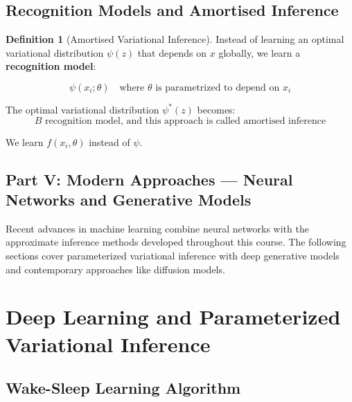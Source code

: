 \documentclass[12pt,a4paper]{article}
\theoremstyle{definition}
\newtheorem{definition}{Definition}[section]
\begin{document}
\subsection{Recognition Models and Amortised Inference}

\begin{definition}[Amortised Variational Inference]
Instead of learning an optimal variational distribution $\psi(z)$ that depends on $x$ globally, we learn a \textbf{recognition model}:

\[
\psi(x_i; \theta) \quad \text{where } \theta \text{ is parametrized to depend on } x_i
\]

The optimal variational distribution $\psi^*(z)$ becomes:
\[
B \text{ recognition model, and this approach is called amortised inference}
\]

We learn $f(x_i, \theta)$ instead of $\psi$.
\end{definition}

\newpage
\vspace*{2cm}
\begin{center}
    \section*{\Large Part V: Modern Approaches --- Neural Networks and Generative Models}
\end{center}
\vspace*{1cm}
\nobreak

Recent advances in machine learning combine neural networks with the approximate inference methods developed throughout this course. The following sections cover parameterized variational inference with deep generative models and contemporary approaches like diffusion models.

\newpage

\section{Deep Learning and Parameterized Variational Inference}

\subsection{Wake-Sleep Learning Algorithm}
\end{document}
